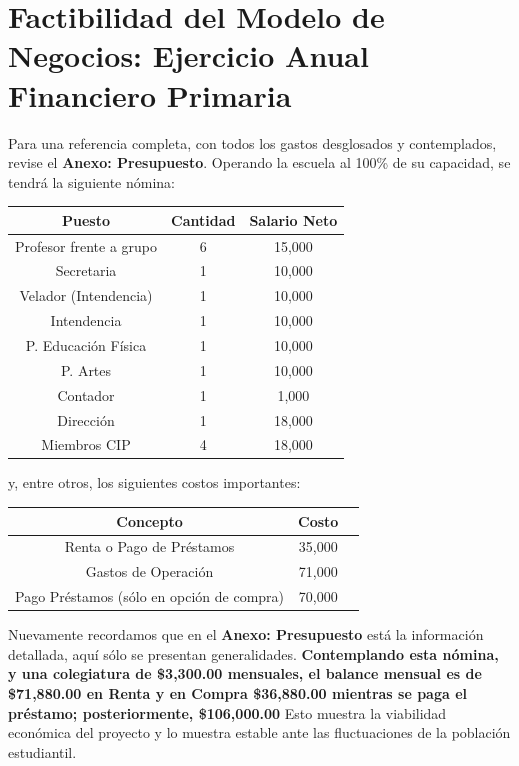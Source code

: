 \documentclass[10pt,letterpaper,oneside]{book}
\begin{document}
\section{Factibilidad del Modelo de Negocios: Ejercicio Anual Financiero Primaria}

Para una referencia completa, con todos los gastos desglosados y contemplados, revise el {\bf Anexo: Presupuesto}. Operando la escuela al 100\% de su capacidad, se tendrá la siguiente nómina:

\begin{center}
\begin{tabular}{|c|c|c|}
\hline 
{\bf Puesto} & {\bf Cantidad} & {\bf Salario Neto} \\ 
\hline 
Profesor frente a grupo & 6 & 15,000 \\ 
\hline 
Secretaria & 1 & 10,000 \\ 
\hline 
Velador (Intendencia) & 1 & 10,000 \\ 
\hline 
Intendencia & 1 & 10,000 \\ 
\hline 
P. Educación Física & 1 & 10,000 \\ 
\hline 
P. Artes & 1 & 10,000 \\ 
\hline 
Contador & 1 & 1,000 \\ 
\hline 
Dirección & 1 & 18,000 \\ 
\hline 
Miembros CIP & 4 & 18,000 \\ 
\hline 
\end{tabular} 
\end{center}
y, entre otros, los siguientes costos importantes:

\begin{center}
\begin{tabular}{|c|c|c|}
\hline 
{\bf Concepto} & {\bf Costo}  \\ 
\hline 
Renta o Pago de Préstamos& 35,000 \\ 
\hline 
Gastos de Operación & 71,000 \\ 
\hline 
Pago Préstamos (sólo en opción de compra) & 70,000 \\ 
\hline 
\end{tabular} 
\end{center}
\vspace{0.3cm}
Nuevamente recordamos que en el {\bf Anexo: Presupuesto} está la información detallada, aquí sólo se presentan generalidades. {\bf\large \color{red} Contemplando esta nómina, y una colegiatura de \$3,300.00 mensuales, el balance mensual es de \$71,880.00 en Renta y en Compra \$36,880.00  mientras se paga el préstamo; posteriormente, \$106,000.00}
Esto muestra la viabilidad económica del proyecto y lo muestra estable ante las fluctuaciones de la población estudiantil.
\vspace{0.3cm}
\end{document}
